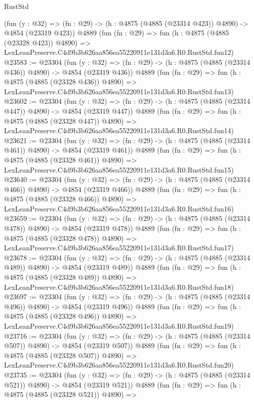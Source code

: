 \begin{lexlean}{RustStd}
\begin{coremodule}
    (fun (y : @32) => (fn : @29) -> (h : @4875 (@4885 (@23314 @423)) @4890) -> @4854 (@23319 @423))
    @4889
    (fun (fn : @29) =>
    fun (h : @4875 (@4885 (@23328 @423)) @4890) =>
    LexLeanPreserve.C4d9b3b626aa856ea55220911e131d3a6.R0.RustStd.fun12)
@23583 := @23304
    (fun (y : @32) => (fn : @29) -> (h : @4875 (@4885 (@23314 @436)) @4890) -> @4854 (@23319 @436))
    @4889
    (fun (fn : @29) =>
    fun (h : @4875 (@4885 (@23328 @436)) @4890) =>
    LexLeanPreserve.C4d9b3b626aa856ea55220911e131d3a6.R0.RustStd.fun13)
@23602 := @23304
    (fun (y : @32) => (fn : @29) -> (h : @4875 (@4885 (@23314 @447)) @4890) -> @4854 (@23319 @447))
    @4889
    (fun (fn : @29) =>
    fun (h : @4875 (@4885 (@23328 @447)) @4890) =>
    LexLeanPreserve.C4d9b3b626aa856ea55220911e131d3a6.R0.RustStd.fun14)
@23621 := @23304
    (fun (y : @32) => (fn : @29) -> (h : @4875 (@4885 (@23314 @461)) @4890) -> @4854 (@23319 @461))
    @4889
    (fun (fn : @29) =>
    fun (h : @4875 (@4885 (@23328 @461)) @4890) =>
    LexLeanPreserve.C4d9b3b626aa856ea55220911e131d3a6.R0.RustStd.fun15)
@23640 := @23304
    (fun (y : @32) => (fn : @29) -> (h : @4875 (@4885 (@23314 @466)) @4890) -> @4854 (@23319 @466))
    @4889
    (fun (fn : @29) =>
    fun (h : @4875 (@4885 (@23328 @466)) @4890) =>
    LexLeanPreserve.C4d9b3b626aa856ea55220911e131d3a6.R0.RustStd.fun16)
@23659 := @23304
    (fun (y : @32) => (fn : @29) -> (h : @4875 (@4885 (@23314 @478)) @4890) -> @4854 (@23319 @478))
    @4889
    (fun (fn : @29) =>
    fun (h : @4875 (@4885 (@23328 @478)) @4890) =>
    LexLeanPreserve.C4d9b3b626aa856ea55220911e131d3a6.R0.RustStd.fun17)
@23678 := @23304
    (fun (y : @32) => (fn : @29) -> (h : @4875 (@4885 (@23314 @489)) @4890) -> @4854 (@23319 @489))
    @4889
    (fun (fn : @29) =>
    fun (h : @4875 (@4885 (@23328 @489)) @4890) =>
    LexLeanPreserve.C4d9b3b626aa856ea55220911e131d3a6.R0.RustStd.fun18)
@23697 := @23304
    (fun (y : @32) => (fn : @29) -> (h : @4875 (@4885 (@23314 @496)) @4890) -> @4854 (@23319 @496))
    @4889
    (fun (fn : @29) =>
    fun (h : @4875 (@4885 (@23328 @496)) @4890) =>
    LexLeanPreserve.C4d9b3b626aa856ea55220911e131d3a6.R0.RustStd.fun19)
@23716 := @23304
    (fun (y : @32) => (fn : @29) -> (h : @4875 (@4885 (@23314 @507)) @4890) -> @4854 (@23319 @507))
    @4889
    (fun (fn : @29) =>
    fun (h : @4875 (@4885 (@23328 @507)) @4890) =>
    LexLeanPreserve.C4d9b3b626aa856ea55220911e131d3a6.R0.RustStd.fun20)
@23735 := @23304
    (fun (y : @32) => (fn : @29) -> (h : @4875 (@4885 (@23314 @521)) @4890) -> @4854 (@23319 @521))
    @4889
    (fun (fn : @29) =>
    fun (h : @4875 (@4885 (@23328 @521)) @4890) =>

\end{coremodule}
\end{lexlean}
